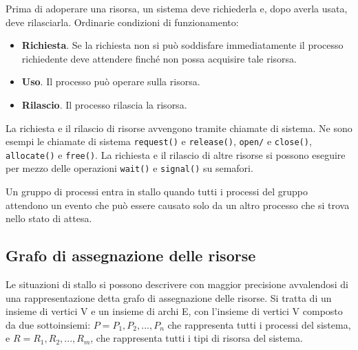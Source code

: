 \documentclass[11pt,a4paper]{article}
\begin{document}
Prima di adoperare una risorsa, un sistema deve richiederla e, dopo averla usata, deve
rilasciarla. Ordinarie condizioni di funzionamento:
\begin{itemize}
  \item \textbf{Richiesta}. Se la richiesta non si può soddisfare immediatamente il processo richiedente deve
attendere finché non possa acquisire tale risorsa.
  \item \textbf{Uso}. Il processo può operare sulla risorsa.
  \item \textbf{Rilascio}. Il processo rilascia la risorsa.
\end{itemize}
%
La richiesta e il rilascio di risorse avvengono tramite chiamate di sistema. Ne sono esempi le chiamate di sistema \texttt{request()} e \texttt{release()}, \texttt{open/} e \texttt{close()}, \texttt{allocate()} e \texttt{free()}. La richiesta e il rilascio di altre risorse si possono ese­guire per mezzo delle operazioni \texttt{wait()} e \texttt{signal()} su semafori.

Un gruppo di processi entra in stallo quando tutti i processi del gruppo attendono un
evento che può essere causato solo da un altro processo che si trova nello stato di attesa.

\subsection{Grafo di assegnazione delle risorse}
Le situazioni di stallo si possono descrivere con maggior precisione avvalendosi di una rap­presentazione detta grafo di assegnazione delle risorse. Si tratta di un insieme di vertici V e
un insieme di archi E, con l'insieme di vertici V composto da due sottoinsiemi: $P = {P_1, P_2, ..., P_n}$ che rappresenta tutti i processi del sistema, e $R = {R_1, R_2, ..., R_m}$, che rappresenta tutti i tipi di risorsa del sistema.
\end{document}
